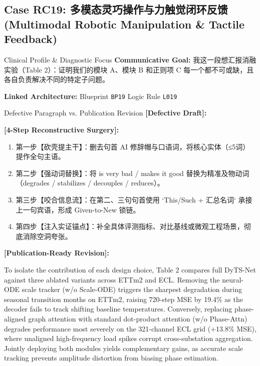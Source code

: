 \subsection{Case RC19: 多模态灵巧操作与力触觉闭环反馈 (Multimodal Robotic Manipulation \& Tactile Feedback)}\label{case:RC19}
\begin{ConceptBox}{Clinical Profile \& Diagnostic Focus}
\textbf{Communicative Goal:} 我这一段想汇报消融实验（Table 2）：证明我们的模块 A、模块 B 和正则项 C 每一个都不可或缺，且各自负责解决不同的特定子问题。\par
\textbf{Linked Architecture:} Blueprint \texttt{BP19} \enspace\textbar\enspace Logic Rule \texttt{L019}
\end{ConceptBox}
\begin{ExampleBox}{Defective Paragraph vs. Publication Revision}
\textbf{\color{TargetHighlight}[Defective Draft]:}\par
{}\par\vspace{6pt}
\textbf{\color{AcadForest}[4-Step Reconstructive Surgery]:}
\begin{enumerate}[label=\textbf{\color{AcadNavy}Step \arabic*:}, leftmargin=2em]
  \item 第一步【砍壳提主干】：删去句首 AI 修辞帽与口语词，将核心实体（≤5词）提作全句主语。
  \item 第二步【强动词替换】：将 is very bad / makes it good 替换为精准及物动词（degrades / stabilizes / decouples / reduces）。
  \item 第三步【咬合信息流】：在第二、三句句首使用 `This/Such + 汇总名词` 承接上一句宾语，形成 Given-to-New 锁链。
  \item 第四步【注入实证锚点】：补全具体评测指标、对比基线或微观工程场景，彻底消除空洞夸张。
\end{enumerate}\vspace{4pt}
\textbf{\color{AcadNavy}[Publication-Ready Revision]:}\par
To isolate the contribution of each design choice, Table 2 compares full DyTS-Net against three ablated variants across ETTm2 and ECL. Removing the neural-ODE scale tracker (w/o Scale-ODE) triggers the sharpest degradation during seasonal transition months on ETTm2, raising 720-step MSE by 19.4\% as the decoder fails to track shifting baseline temperatures. Conversely, replacing phase-aligned graph attention with standard dot-product attention (w/o Phase-Attn) degrades performance most severely on the 321-channel ECL grid (+13.8\% MSE), where unaligned high-frequency load spikes corrupt cross-substation aggregation. Jointly deploying both modules yields complementary gains, as accurate scale tracking prevents amplitude distortion from biasing phase estimation.
\end{ExampleBox}
